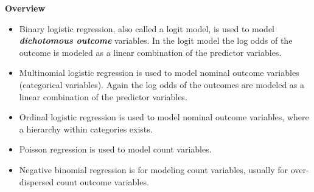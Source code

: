 \documentclass[00-GLMregslides.tex]{subfiles}
\begin{document}
	\begin{frame}
		\LARGE
		\textbf{Overview}
	\end{frame}
\begin{frame}
\Large
\begin{itemize}
\item Binary logistic regression, also called a logit model, is used to model \textbf{\textit{dichotomous outcome}} variables. In the logit model the log odds of the outcome is modeled as a linear combination of the predictor variables.
\item Multinomial logistic regression is used to model nominal outcome variables (categorical variables). Again the log odds of the outcomes are modeled as a linear combination of the predictor variables.

\end{itemize}
\end{frame}
\begin{frame}
\Large
\begin{itemize}
	\item Ordinal logistic regression is used to model nominal outcome variables, where a hierarchy within categories exists.
	
\item  Poisson regression is used to model count variables.
\item  Negative binomial regression is for modeling count variables, usually for over-dispersed count outcome variables.
\end{itemize}
\end{frame}
\end{document}
